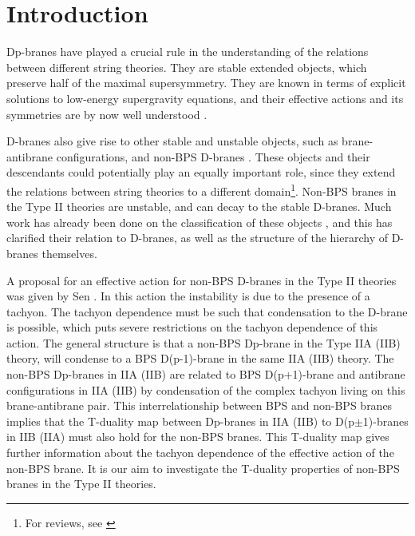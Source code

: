 \documentclass[12pt,a4paper]{article}
\begin{document}
\newpage

\pagestyle{plain}

\setcounter{section}{0}
\section{Introduction}

Dp-branes \cite{Po} have played a crucial rule in the understanding of
 the relations between different string theories. They are stable extended
 objects, which preserve half of the maximal supersymmetry. They are
 known in terms of explicit solutions to low-energy supergravity equations,
 and their effective actions and its symmetries are by now well
 understood \cite{Po2}.

D-branes also give rise to other stable and
 unstable objects, such as brane-antibrane configurations, and
 non-BPS D-branes  \cite{Sen1,Sen2,Sen3}.
 These objects and their descendants
 could potentially play an equally important role, since
 they extend the relations between string theories to a different
 domain\footnote{For reviews, see \cite{Sen4,Lerda, S1}}.
 Non-BPS branes in  the Type II theories are unstable,
 and can decay to the stable
 D-branes. Much work has already been done on the classification of these
 objects \cite{Wit1,Ho1},
 and this has clarified their relation to D-branes, as well
 as the structure of the hierarchy of D-branes themselves.

A proposal for an effective action for non-BPS D-branes in the Type II
 theories was given by Sen \cite{Sen5}.
 In this action the instability is due to the presence of a tachyon. The
 tachyon dependence must be such that condensation to the D-brane is
 possible, which puts severe restrictions on the tachyon dependence
 of this action. The general structure is that a non-BPS Dp-brane in
 the Type IIA (IIB) theory, will condense to a BPS
 D(p-1)-brane in the same IIA (IIB) theory. The non-BPS Dp-branes
 in IIA (IIB)  are related to BPS D(p+1)-brane and antibrane configurations
 in IIA (IIB) by condensation of the complex tachyon living on this
 brane-antibrane pair. This interrelationship between BPS and non-BPS branes
 implies that the T-duality map between Dp-branes in IIA (IIB) to
 D(p$\pm$1)-branes in IIB (IIA) must also hold for the non-BPS branes.
 This T-duality map gives further information about the tachyon dependence
 of the effective action of the non-BPS brane. It is our aim to investigate
 the T-duality properties of non-BPS branes in the Type II theories.
\end{document}
